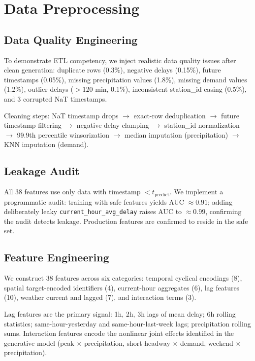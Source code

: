 \documentclass[conference]{IEEEtran}
\begin{document}
\section{Data Preprocessing}

\subsection{Data Quality Engineering}

To demonstrate ETL competency, we inject realistic data quality issues after clean generation:
duplicate rows (0.3\%), negative delays (0.15\%), future timestamps (0.05\%), missing
precipitation values (1.8\%), missing demand values (1.2\%), outlier delays ($>$120 min, 0.1\%),
inconsistent station\_id casing (0.5\%), and 3 corrupted NaT timestamps.

Cleaning steps: NaT timestamp drops $\to$ exact-row deduplication $\to$ future timestamp
filtering $\to$ negative delay clamping $\to$ station\_id normalization $\to$ 99.9th percentile
winsorization $\to$ median imputation (precipitation) $\to$ KNN imputation (demand).

\subsection{Leakage Audit}

All 38 features use only data with timestamp $< t_{\text{predict}}$.
We implement a programmatic audit: training with safe features yields AUC $\approx 0.91$;
adding deliberately leaky \texttt{current\_hour\_avg\_delay} raises AUC to $\approx 0.99$,
confirming the audit detects leakage. Production features are confirmed to reside in the
safe set.

\subsection{Feature Engineering}

We construct 38 features across six categories: temporal cyclical encodings (8),
spatial target-encoded identifiers (4), current-hour aggregates (6), lag features (10),
weather current and lagged (7), and interaction terms (3).

Lag features are the primary signal: 1h, 2h, 3h lags of mean delay; 6h rolling statistics;
same-hour-yesterday and same-hour-last-week lags; precipitation rolling sums.
Interaction features encode the nonlinear joint effects identified in the generative model
(peak $\times$ precipitation, short headway $\times$ demand, weekend $\times$ precipitation).
\end{document}
